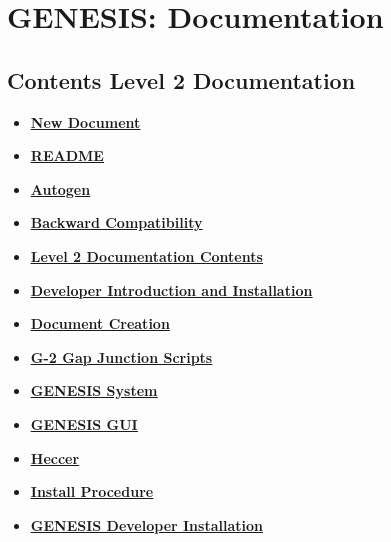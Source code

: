 \documentclass[12pt]{article}
\begin{document}
\section*{GENESIS: Documentation}

\subsection*{Contents Level 2 Documentation}

\begin{itemize}

\item \href{../NewDocument/NewDocument.pdf}{\bf \underline{New Document}}

\item \href{../README/README.pdf}{\bf \underline{README}}

\item \href{../autogen/autogen.pdf}{\bf \underline{Autogen}}

\item \href{../backward-compatibility/backward-compatibility.pdf}{\bf \underline{Backward Compatibility}}

\item \href{../contents-level2/contents-level2.pdf}{\bf \underline{Level 2 Documentation Contents}}

\item \href{../developers-intro/developers-intro.pdf}{\bf \underline{Developer Introduction and Installation}}

\item \href{../document-create/document-create.pdf}{\bf \underline{Document Creation}}

\item \href{../g2-gap-junction/g2-gap-junction.pdf}{\bf \underline{G-2 Gap Junction Scripts}}

\item \href{../genesis-system/genesis-system.pdf}{\bf \underline{GENESIS System}}

\item \href{../gui/gui.pdf}{\bf \underline{GENESIS GUI}}

\item \href{../heccer/heccer.pdf}{\bf \underline{Heccer}}

\item \href{../install-procedure/install-procedure.pdf}{\bf \underline{Install Procedure}}

\item \href{../installation-developer/installation-developer.pdf}{\bf \underline{GENESIS Developer Installation}}


\end{itemize}
\end{document}
